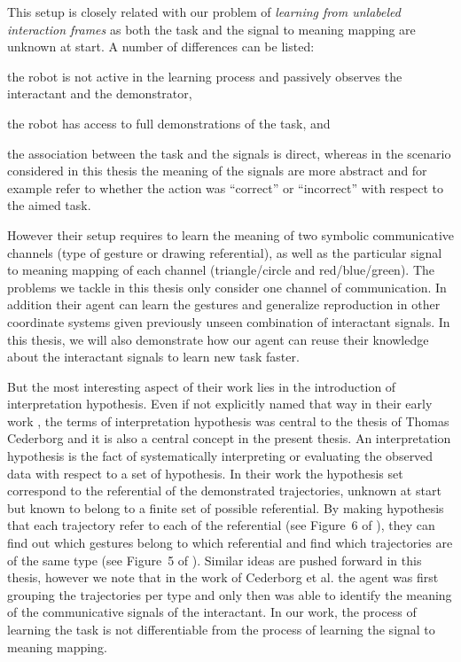 This setup is closely related with our problem of \emph{learning from unlabeled interaction frames} as both the task and the signal to meaning mapping are unknown at start. A number of differences can be listed: \begin{inparaenum}[a)] \item the robot is not active in the learning process and passively observes the interactant and the demonstrator, \item  the robot has access to full demonstrations of the task, and \item the association between the task and the signals is direct, whereas in the scenario considered in this thesis the meaning of the signals are more abstract and for example refer to whether the action was ``correct'' or ``incorrect'' with respect to the aimed task. \end{inparaenum} However their setup requires to learn the meaning of two symbolic communicative channels (type of gesture or drawing referential), as well as the particular signal to meaning mapping of each channel (triangle/circle and red/blue/green). The problems we tackle in this thesis only consider one channel of communication. In addition their agent can learn the gestures and generalize reproduction in other coordinate systems given previously unseen combination of interactant signals. In this thesis, we will also demonstrate how our agent can reuse their knowledge about the interactant signals to learn new task faster.

But the most interesting aspect of their work lies in the introduction of interpretation hypothesis. Even if not explicitly named that way in their early work \cite{cederborg2011imitating}, the terms of interpretation hypothesis was central to the thesis of Thomas Cederborg \cite{cederborg2014thesis} and it is also a central concept in the present thesis. An interpretation hypothesis is the fact of systematically interpreting or evaluating the observed data with respect to a set of hypothesis. In their work the hypothesis set correspond to the referential of the demonstrated trajectories, unknown at start but known to belong to a finite set of possible referential. By making hypothesis that each trajectory refer to each of the referential (see Figure~6 of \cite{cederborg2011imitating}), they can find out which gestures belong to which referential and find which trajectories are of the same type (see Figure~5 of \cite{cederborg2011imitating}). Similar ideas are pushed forward in this thesis, however we note that in the work of Cederborg et al. the agent was first grouping the trajectories per type and only then was able to identify the meaning of the communicative signals of the interactant. In our work, the process of learning the task is not differentiable from the process of learning the signal to meaning mapping.

